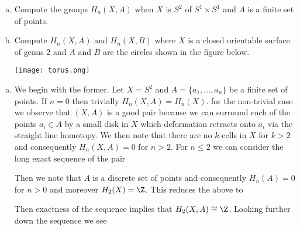 \documentclass{article}
\begin{document}
\begin{problem}{1}{\parindent}
  \vspace*{-\bigskipamount}
  \begin{enumerate}[(a)]
  \item Compute the groups $H_n(X,A)$ when $X$ is $S^2$ of $S^1\times
    S^1$ and $A$ is a finite set of points.
  \item Compute $H_n(X,A)$ and $H_n(X,B)$ where $X$ is a closed
    orientable surface of genus 2 and $A$ and $B$ are the circles
    shown in the figure below.
    \begin{center}
      \texttt{[image: torus.png]}
    \end{center}
  \end{enumerate}
\end{problem}
\begin{solution}{\parindent}
  \begin{enumerate}[(a)]
  \item We begin with the former. Let $X = S^2$ and $A =
    \{a_1,\ldots,a_n\}$ be a finite set of points. If $n = 0$ then
    trivially $H_n(X,A) = H_n(X)$. for the non-trivial case we observe
    that $(X,A)$ is a good pair because we can surround each of the
    points $a_i \in A$ by a small disk in $X$ which deformation
    retracts onto $a_i$ via the straight line homotopy. We then note
    that there are no $k$-cells in $X$ for $k > 2$ and consequently
    $H_n(X,A) = 0$ for $n > 2$. For $n \leq 2$ we can consider the
    long exact sequence of the pair
    \begin{center}
    \end{center}
    Then we note that $A$ is a discrete set of points and consequently
    $H_n(A) = 0$ for $n > 0$ and moreover $H_2(X) = \Z$. This reduces
    the above to
    \begin{center}
    \end{center}
    Then exactness of the sequence implies that $H_2(X,A) \cong
    \Z$. Looking further down the sequence we see
    \begin{center}
      \begin{tikzcd}

\end{tikzcd}
\end{center}
\end{enumerate}
\end{solution}
\end{document}
